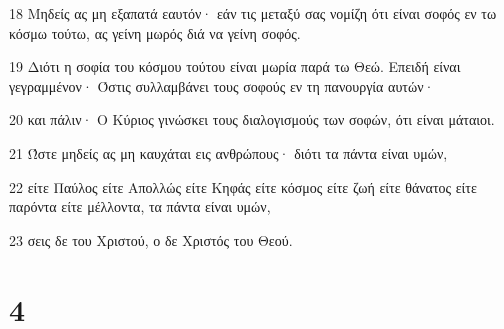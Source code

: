\par 18 Μηδείς ας μη εξαπατά εαυτόν· εάν τις μεταξύ σας νομίζη ότι είναι σοφός εν τω κόσμω τούτω, ας γείνη μωρός διά να γείνη σοφός.
\par 19 Διότι η σοφία του κόσμου τούτου είναι μωρία παρά τω Θεώ. Επειδή είναι γεγραμμένον· Όστις συλλαμβάνει τους σοφούς εν τη πανουργία αυτών·
\par 20 και πάλιν· Ο Κύριος γινώσκει τους διαλογισμούς των σοφών, ότι είναι μάταιοι.
\par 21 Ώστε μηδείς ας μη καυχάται εις ανθρώπους· διότι τα πάντα είναι υμών,
\par 22 είτε Παύλος είτε Απολλώς είτε Κηφάς είτε κόσμος είτε ζωή είτε θάνατος είτε παρόντα είτε μέλλοντα, τα πάντα είναι υμών,
\par 23 σεις δε του Χριστού, ο δε Χριστός του Θεού.

\chapter{4}


